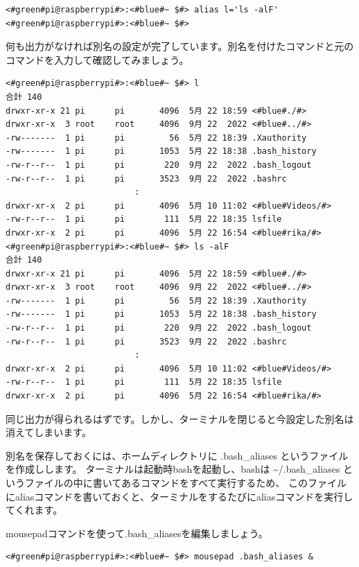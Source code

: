 \documentclass[text03.tex]{subfiles}
\begin{document}
\begin{lstlisting}[caption=aliasコマンドの例, label=aliasCommandExample]
<#green#pi@raspberrypi#>:<#blue#~ $#> alias l='ls -alF'
<#green#pi@raspberrypi#>:<#blue#~ $#>
\end{lstlisting}
何も出力がなければ別名の設定が完了しています。別名を付けたコマンドと元のコマンドを入力して確認してみましょう。
\begin{lstlisting}[caption=別名の確認, label=confirmAlias]
<#green#pi@raspberrypi#>:<#blue#~ $#> l
合計 140
drwxr-xr-x 21 pi      pi       4096  5月 22 18:59 <#blue#./#>
drwxr-xr-x  3 root    root     4096  9月 22  2022 <#blue#../#>
-rw-------  1 pi      pi         56  5月 22 18:39 .Xauthority
-rw-------  1 pi      pi       1053  5月 22 18:38 .bash_history
-rw-r--r--  1 pi      pi        220  9月 22  2022 .bash_logout
-rw-r--r--  1 pi      pi       3523  9月 22  2022 .bashrc
                          : 
drwxr-xr-x  2 pi      pi       4096  5月 10 11:02 <#blue#Videos/#>
-rw-r--r--  1 pi      pi        111  5月 22 18:35 lsfile
drwxr-xr-x  2 pi      pi       4096  5月 22 16:54 <#blue#rika/#>
<#green#pi@raspberrypi#>:<#blue#~ $#> ls -alF
合計 140
drwxr-xr-x 21 pi      pi       4096  5月 22 18:59 <#blue#./#>
drwxr-xr-x  3 root    root     4096  9月 22  2022 <#blue#../#>
-rw-------  1 pi      pi         56  5月 22 18:39 .Xauthority
-rw-------  1 pi      pi       1053  5月 22 18:38 .bash_history
-rw-r--r--  1 pi      pi        220  9月 22  2022 .bash_logout
-rw-r--r--  1 pi      pi       3523  9月 22  2022 .bashrc
                          :
drwxr-xr-x  2 pi      pi       4096  5月 10 11:02 <#blue#Videos/#>
-rw-r--r--  1 pi      pi        111  5月 22 18:35 lsfile
drwxr-xr-x  2 pi      pi       4096  5月 22 16:54 <#blue#rika/#>
\end{lstlisting}
同じ出力が得られるはずです。しかし、ターミナルを閉じると今設定した別名は消えてしまいます。

別名を保存しておくには、ホームディレクトリに .bash{\_}aliases というファイルを作成しします。
ターミナルは起動時bashを起動し、bashは \textasciitilde/.bash{\_}aliases というファイルの中に書いてあるコマンドをすべて実行するため、
このファイルにaliasコマンドを書いておくと、ターミナルをするたびにaliasコマンドを実行してくれます。

mousepadコマンドを使って.bash{\_}aliasesを編集しましょう。
\begin{lstlisting}[caption=\textasciitilde/.bash\_aliasesを開く, label=openingbashAliases]
<#green#pi@raspberrypi#>:<#blue#~ $#> mousepad .bash_aliases &
\end{lstlisting}
\end{document}
